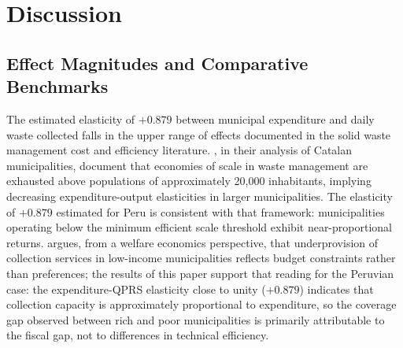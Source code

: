 
\section{Discussion}
\label{sec:discusion}

\subsection{Effect Magnitudes and Comparative Benchmarks}
\label{sec:benchmarks}

The estimated elasticity of $+0.879$ between municipal expenditure and daily waste collected falls in the upper range of effects documented in the solid waste management cost and efficiency literature. \citet{Bel2010}, in their analysis of Catalan municipalities, document that economies of scale in waste management are exhausted above populations of approximately 20,000 inhabitants, implying decreasing expenditure-output elasticities in larger municipalities. The elasticity of $+0.879$ estimated for Peru is consistent with that framework: municipalities operating below the minimum efficient scale threshold exhibit near-proportional returns. \citet{Kinnaman2006} argues, from a welfare economics perspective, that underprovision of collection services in low-income municipalities reflects budget constraints rather than preferences; the results of this paper support that reading for the Peruvian case: the expenditure-QPRS elasticity close to unity ($+0.879$) indicates that collection capacity is approximately proportional to expenditure, so the coverage gap observed between rich and poor municipalities is primarily attributable to the fiscal gap, not to differences in technical efficiency.

